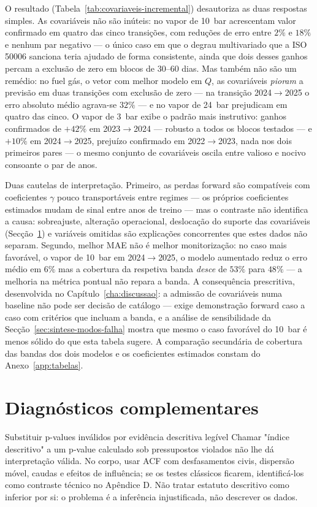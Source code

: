 O resultado (Tabela~\ref{tab:covariaveis-incremental}) desautoriza as duas respostas
simples. As covariáveis não são inúteis: no vapor de 10~bar acrescentam valor
confirmado em quatro das cinco transições, com reduções de erro entre $2\%$ e
$18\%$ e nenhum par negativo --- o único caso em que o degrau multivariado
que a ISO 50006 sanciona teria ajudado de forma consistente, ainda que dois
desses ganhos percam a exclusão de zero em blocos de 30--60 dias. Mas também
não são um remédio: no fuel gás, o vetor com melhor modelo em $Q$, as
covariáveis \emph{pioram} a previsão em duas transições com exclusão de zero
--- na transição 2024${\to}$2025 o erro absoluto médio agrava-se $32\%$ --- e
no vapor de 24~bar prejudicam em quatro das cinco. O vapor de 3~bar exibe o
padrão mais instrutivo: ganhos confirmados de $+42\%$ em 2023${\to}$2024 ---
robusto a todos os blocos testados --- e $+10\%$ em 2024${\to}$2025, prejuízo
confirmado em 2022${\to}$2023, nada nos dois primeiros pares --- o mesmo
conjunto de covariáveis oscila entre valioso e nocivo consoante o par de
anos.

Duas cautelas de interpretação. Primeiro, as perdas forward são compatíveis
com coeficientes $\gamma$ pouco transportáveis entre regimes --- os próprios
coeficientes estimados mudam de sinal entre anos de treino --- mas o contraste
não identifica a causa: sobreajuste, alteração operacional, deslocação do
suporte das covariáveis (Secção~\ref{sec:diagnosticos-desc}) e variáveis
omitidas são explicações concorrentes que estes dados não separam. Segundo,
melhor MAE não é melhor monitorização: no caso mais favorável, o vapor de
10~bar em 2024${\to}$2025, o modelo aumentado reduz o erro médio em $6\%$ mas
a cobertura da respetiva banda \emph{desce} de $53\%$ para $48\%$ --- a
melhoria na métrica pontual não repara a banda. A consequência prescritiva,
desenvolvida no Capítulo~\ref{cha:discussao}: a admissão de covariáveis numa
baseline não pode ser decisão de catálogo --- exige demonstração forward caso
a caso com critérios que incluam a banda, e a análise de sensibilidade da
Secção~\ref{sec:sintese-modos-falha} mostra que mesmo o caso favorável do
10~bar é menos sólido do que esta tabela sugere. A comparação secundária de
cobertura das bandas dos dois modelos e os coeficientes estimados constam do
Anexo~\ref{app:tabelas}.


\section{Diagnósticos complementares}
\label{sec:diagnosticos-desc}
{Substituir p-values inválidos por evidência descritiva legível}
{Chamar "índice descritivo" a um p-value calculado sob pressupostos
violados não lhe dá interpretação válida. No corpo, usar ACF com
desfasamentos civis, dispersão móvel, caudas e efeitos de influência;
se os testes clássicos ficarem, identificá-los como contraste técnico
no Apêndice D. Não tratar estatuto descritivo como inferior por si:
o problema é a inferência injustificada, não descrever os dados.}%

